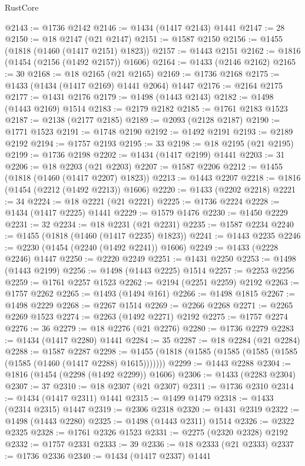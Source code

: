 \begin{lexlean}{RustCore}
\begin{coremodule}
@2143 := @1736 @2142
@2146 := @1434 (@1417 @2143) @1441
@2147 := 28
@2150 := @18 @2147 (@21 @2147)
@2151 := @1587 @2150
@2156 := @1455 (@1818 (@1460 (@1417 @2151) @1823))
@2157 := @1443 @2151
@2162 := @1816 (@1454 (@2156 (@1492 @2157)) @1606)
@2164 := @1433 (@2146 @2162)
@2165 := 30
@2168 := @18 @2165 (@21 @2165)
@2169 := @1736 @2168
@2175 := @1433 (@1434 (@1417 @2169) @1441 @2064) @1447
@2176 := @2164 @2175
@2177 := @1431 @2176
@2179 := @1498 (@1443 @2143)
@2182 := @1498 (@1443 @2169) @1514
@2183 := @2179 @2182
@2185 := @1761 @2183 @1523
@2187 := @2138 (@2177 @2185)
@2189 := @2093 (@2128 @2187)
@2190 := @1771 @1523
@2191 := @1748 @2190
@2192 := @1492 @2191
@2193 := @2189 @2192
@2194 := @1757 @2193
@2195 := 33
@2198 := @18 @2195 (@21 @2195)
@2199 := @1736 @2198
@2202 := @1434 (@1417 @2199) @1441
@2203 := 31
@2206 := @18 @2203 (@21 @2203)
@2207 := @1587 @2206
@2212 := @1455 (@1818 (@1460 (@1417 @2207) @1823))
@2213 := @1443 @2207
@2218 := @1816 (@1454 (@2212 (@1492 @2213)) @1606)
@2220 := @1433 (@2202 @2218)
@2221 := 34
@2224 := @18 @2221 (@21 @2221)
@2225 := @1736 @2224
@2228 := @1434 (@1417 @2225) @1441
@2229 := @1579 @1476
@2230 := @1450 @2229
@2231 := 32
@2234 := @18 @2231 (@21 @2231)
@2235 := @1587 @2234
@2240 := @1455 (@1818 (@1460 (@1417 @2235) @1823))
@2241 := @1443 @2235
@2246 := @2230 (@1454 (@2240 (@1492 @2241)) @1606)
@2249 := @1433 (@2228 @2246) @1447
@2250 := @2220 @2249
@2251 := @1431 @2250
@2253 := @1498 (@1443 @2199)
@2256 := @1498 (@1443 @2225) @1514
@2257 := @2253 @2256
@2259 := @1761 @2257 @1523
@2262 := @2194 (@2251 @2259) @2192
@2263 := @1757 @2262
@2265 := @1493 (@1494 @161)
@2266 := @1498 @1815
@2267 := @1498 @2229
@2268 := @2267 @1514
@2269 := @2266 @2268
@2271 := @2265 @2269 @1523
@2274 := @2263 (@1492 @2271) @2192
@2275 := @1757 @2274
@2276 := 36
@2279 := @18 @2276 (@21 @2276)
@2280 := @1736 @2279
@2283 := @1434 (@1417 @2280) @1441
@2284 := 35
@2287 := @18 @2284 (@21 @2284)
@2288 := @1587 @2287
@2298 := @1455 (@1818 (@1585 (@1585 (@1585 (@1585 (@1585 (@1460 (@1417 @2288) @1615)))))))
@2299 := @1443 @2288
@2304 := @1816 (@1454 (@2298 (@1492 @2299)) @1606)
@2306 := @1433 (@2283 @2304)
@2307 := 37
@2310 := @18 @2307 (@21 @2307)
@2311 := @1736 @2310
@2314 := @1434 (@1417 @2311) @1441
@2315 := @1499 @1479
@2318 := @1433 (@2314 @2315) @1447
@2319 := @2306 @2318
@2320 := @1431 @2319
@2322 := @1498 (@1443 @2280)
@2325 := @1498 (@1443 @2311) @1514
@2326 := @2322 @2325
@2328 := @1761 @2326 @1523
@2331 := @2275 (@2320 @2328) @2192
@2332 := @1757 @2331
@2333 := 39
@2336 := @18 @2333 (@21 @2333)
@2337 := @1736 @2336
@2340 := @1434 (@1417 @2337) @1441

\end{coremodule}
\end{lexlean}
